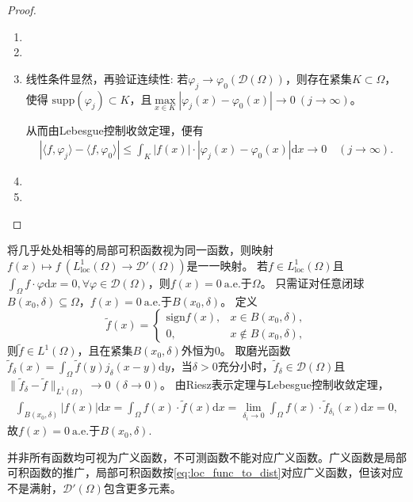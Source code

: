 \documentclass[../../main.tex]{subfiles}%
\begin{document}
\begin{proof}
\begin{enumerate}[(1)]
\item 

\item 

\item 线性条件显然，再验证连续性: 若$\varphi_j \to \varphi_0(\mathscr{D}(\Omega))$，则存在紧集$K\subset \Omega$，使得
$\mathrm{supp}(\varphi_j) \subset K$，且$\max\limits_{x\in K}|\varphi_j(x)-\varphi_0(x)| \to 0\ (j\to\infty)$。

从而由Lebesgue控制收敛定理，便有
\begin{align*}
|\langle f, \varphi_j\rangle - \langle f, \varphi_0\rangle|
\leqslant \int_K |f(x)|\cdot|\varphi_j(x)-\varphi_0(x)|\mathrm{d}x \to 0 \quad (j\to\infty).
\end{align*}

\item 

\item 
\end{enumerate}
\end{proof}

\begin{remark}
将几乎处处相等的局部可积函数视为同一函数，则映射$f(x)\mapsto f\ (L^1_{\mathrm{loc}}(\Omega)\to\mathscr{D}'(\Omega))$是一一映射。
若$f\in L^1_{\mathrm{loc}}(\Omega)$且$\int_{\Omega}f\cdot\varphi\mathrm{d}x=0,\forall\varphi\in\mathscr{D}(\Omega)$，则$f(x)=0\ \mathrm{a.e.}$于$\Omega$。
只需证对任意闭球$B(x_0,\delta)\subseteq\Omega$，$f(x)=0\ \mathrm{a.e.}$于$B(x_0,\delta)$。
定义
$$\widetilde{f}(x)=
\begin{cases}
\mathrm{sign}f(x),&x\in B(x_0,\delta),\\
0,&x\notin B(x_0,\delta),
\end{cases}$$
则$\widetilde{f}\in L^1(\Omega)$，且在紧集$B(x_0,\delta)$外恒为0。
取磨光函数$\widetilde{f}_\delta(x)=\int_{\Omega}\widetilde{f}(y)j_\delta(x-y)\mathrm{d}y$，当$\delta>0$充分小时，$\widetilde{f}_\delta\in\mathscr{D}(\Omega)$且$\|\widetilde{f}_\delta-\widetilde{f}\|_{L^1(\Omega)}\to0\ (\delta\to0)$。
由Riesz表示定理与Lebesgue控制收敛定理，
\begin{align*}
\int_{B(x_0,\delta)}|f(x)|\mathrm{d}x=\int_{\Omega}f(x)\cdot\widetilde{f}(x)\mathrm{d}x
=\lim\limits_{\delta_i\to0}\int_{\Omega}f(x)\cdot\widetilde{f}_{\delta_i}(x)\mathrm{d}x=0,
\end{align*}
故$f(x)=0\ \mathrm{a.e.}$于$B(x_0,\delta)$.
\end{remark}
\begin{remark}
并非所有函数均可视为广义函数，不可测函数不能对应广义函数。广义函数是局部可积函数的推广，局部可积函数按\eqref{eq:loc_func_to_dist}对应广义函数，但该对应不是满射，$\mathscr{D}'(\Omega)$包含更多元素。
\end{remark}
\end{document}
